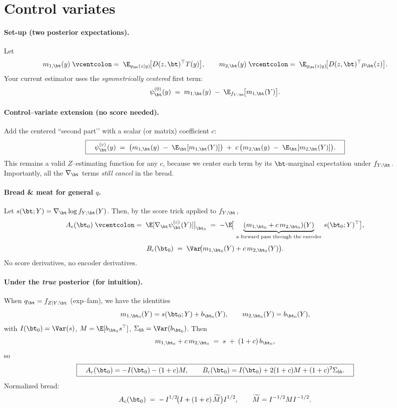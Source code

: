 \section{Control variates}

\paragraph{Set-up (two posterior expectations).}
Let
\[
m_{1,\bt}(y)\;\vcentcolon=\;\E_{q_\bt(z\mid y)}\!\big[D(z,\bt)^\top T(y)\big],
\qquad
m_{2,\bt}(y)\;\vcentcolon=\;\E_{q_\bt(z\mid y)}\!\big[D(z,\bt)^\top \mu_\bt(z)\big].
\]
Your current estimator uses the \emph{symmetrically centered} first term:
\[
\psi_\bt^{(0)}(y)\;=\;m_{1,\bt}(y)\;-\;\E_{f_{Y;\bt}}\!\big[m_{1,\bt}(Y)\big].
\]

\paragraph{Control–variate extension (no score needed).}
Add the centered “second part’’ with a scalar (or matrix) coefficient \(c\):
\[
\boxed{\quad
\psi_\bt^{(c)}(y)\;=\;\big(m_{1,\bt}(y)\;-\;\E_\bt[m_{1,\bt}(Y)]\big)\;+\;c\,\big(m_{2,\bt}(y)\;-\;\E_\bt[m_{2,\bt}(Y)]\big).
\quad}
\]
This remains a valid $Z$–estimating function for any \(c\), because we center each
term by its \(\bt\)-marginal expectation under \(f_{Y;\bt}\). Importantly, all the
\(\nabla_\bt\) terms \emph{still cancel} in the bread.

\paragraph{Bread \& meat for general \(q\).}
Let \(s(\bt;Y)=\nabla_\bt\log f_{Y;\bt}(Y)\).
Then, by the score trick applied to \(f_{Y;\bt}\),
\[
A_c(\bt_0)\;\vcentcolon=\;\E[\nabla_\bt \psi_\bt^{(c)}(Y)]\big|_{\bt_0}
\;=\;-\E\!\big[\,\underbrace{(m_{1,\bt_0}+c\,m_{2,\bt_0})(Y)}_{\text{a forward pass through the encoder}}\,s(\bt_0;Y)^\top\big],
\]
\[
B_c(\bt_0)\;=\;\Var\!\big(m_{1,\bt_0}(Y)+c\,m_{2,\bt_0}(Y)\big).
\]
No score derivatives, no encoder derivatives.

\paragraph{Under the \emph{true} posterior (for intuition).}
When \(q_\bt=f_{Z\mid Y;\bt}\) (exp–fam), we have the identities
\[
m_{1,\bt_0}(Y)=s(\bt_0;Y)+b_{\bt_0}(Y),\qquad m_{2,\bt_0}(Y)=b_{\bt_0}(Y),
\]
with \(I(\bt_0)=\Var(s)\), \(M=\E[b_{\bt_0}s^\top]\), \(\Sigma_{bb}=\Var(b_{\bt_0})\).
Then
\[
m_{1,\bt_0}+c\,m_{2,\bt_0}\;=\;s\;+\;(1+c)\,b_{\bt_0},
\]
so
\[
\boxed{\quad
A_c(\bt_0)=-I(\bt_0)-(1+c)M,\qquad
B_c(\bt_0)=I(\bt_0)+2(1+c)M+(1+c)^2\Sigma_{bb}.
\quad}
\]
Normalized bread:
\[
A_c(\bt_0)\;=\;-\,I^{1/2}\!\big(I+(1+c)\,\widetilde M\big)I^{1/2},\qquad
\widetilde M=I^{-1/2}MI^{-1/2}.
\]

